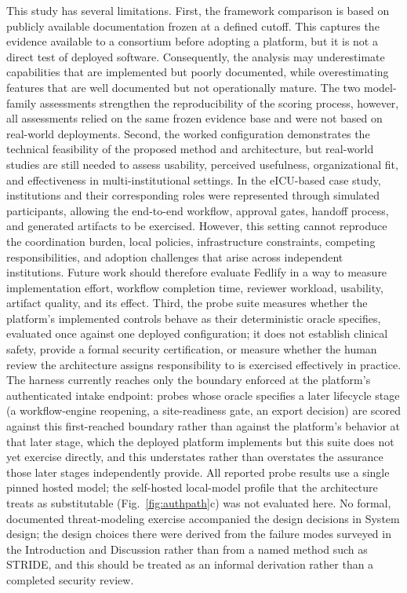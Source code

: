 \documentclass[preprint,5p, 10pt, times]{elsarticle}
\begin{document}
This study has several limitations.
First, the framework comparison is based on publicly available documentation frozen at a defined cutoff. This captures the evidence available to a consortium before adopting a platform, but it is not a direct test of deployed software. Consequently, the analysis may underestimate capabilities that are implemented but poorly documented, while overestimating features that are well documented but not operationally mature. The two model-family assessments strengthen the reproducibility of the scoring process, however, all assessments relied on the same frozen evidence base and were not based on real-world deployments.
%
Second, the worked configuration demonstrates the technical feasibility of the proposed method and architecture, but real-world studies are still needed to assess usability, perceived usefulness, organizational fit, and effectiveness in multi-institutional settings. In the eICU-based case study, institutions and their corresponding roles were represented through simulated participants, allowing the end-to-end workflow, approval gates, handoff process, and generated artifacts to be exercised. However, this setting cannot reproduce the coordination burden, local policies, infrastructure constraints, competing responsibilities, and adoption challenges that arise across independent institutions. Future work should therefore evaluate Fedlify in a way to  measure implementation effort, workflow completion time, reviewer workload, usability, artifact quality, and its effect.
%
Third, the probe suite measures whether the platform's implemented controls behave as their deterministic oracle specifies, evaluated once against one deployed configuration; it does not establish clinical safety, provide a formal security certification, or measure whether the human review the architecture assigns responsibility to is exercised effectively in practice. The harness currently reaches only the boundary enforced at the platform's authenticated intake endpoint: probes whose oracle specifies a later lifecycle stage (a workflow-engine reopening, a site-readiness gate, an export decision) are scored against this first-reached boundary rather than against the platform's behavior at that later stage, which the deployed platform implements but this suite does not yet exercise directly, and this understates rather than overstates the assurance those later stages independently provide. All reported probe results use a single pinned hosted model; the self-hosted local-model profile that the architecture treats as substitutable (Fig.~\ref{fig:authpath}c) was not evaluated here. No formal, documented threat-modeling exercise accompanied the design decisions in System design; the design choices there were derived from the failure modes surveyed in the Introduction and Discussion rather than from a named method such as STRIDE, and this should be treated as an informal derivation rather than a completed security review.
\end{document}
